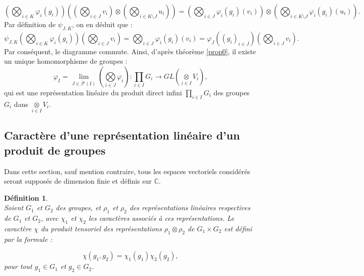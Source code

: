 \documentclass[a4paper, 14pt]{report}
\newtheorem{definition}{Définition}[section]
\begin{document}
\begin{onehalfspace}
{			\[
			\left( \bigotimes_{i \in K} \varphi_i(g_i) \right) \left( \left( \bigotimes_{i \in J} v_i \right) \otimes \left( \bigotimes_{i \in K \setminus J} u_i \right) \right) = \left( \bigotimes_{i \in J} \varphi_i(g_i)(v_i) \right) \otimes \left( \bigotimes_{i \in K \setminus J} \varphi_i(g_i)(u_i) \right).
			\]
			Par définition de \( \psi_{J,K} \), on en déduit que :
			\[
			\psi_{J,K}\left( \bigotimes_{i \in K} \varphi_i(g_i) \right)\left( \bigotimes_{i \in J} v_i \right) = \bigotimes_{i \in J} \varphi_i(g_i)(v_i) = \varphi_J\left( (g_i)_{i \in J} \right) \left( \bigotimes_{i \in J} v_i \right).
			\]
			Par conséquent, le diagramme commute. Ainsi, d'après théorème \ref{prop0}, il existe un unique homomorphisme de groupes :
			$$
			\varphi_I = 	\underset{\overleftarrow{J \in \mathcal{F}(I)}}{\lim} ( \underset{i \in J}{\bigotimes} \varphi_i) : \underset{i\in I} \prod G_i \longrightarrow GL(\underset{i\in I} \otimes V_i),
			$$
			qui est une représentation linéaire du produit direct infini \( \underset{i\in I} \prod G_i \) des groupes \( G_i \) dans \( \underset{i\in I} \otimes V_i \).
			
			\subsection{Caractère d'une représentation linéaire d'un produit de groupes}
Dans cette section, sauf mention contraire, tous les espaces vectoriels considérés seront supposés de dimension finie et définis sur \( \mathbb{C} \). \\
			
			\begin{definition} \cite{serre1971representation}\\
Soient \( G_1 \) et \( G_2 \) des groupes, et \( \rho_1 \) et \( \rho_2 \) des représentations linéaires respectives de \( G_1 \) et \( G_2 \), avec \( \chi_1 \) et \( \chi_2 \) les caractères associés à ces représentations. Le caractère \( \chi \) du produit tensoriel des représentations \( \rho_1 \otimes \rho_2 \) de \( G_1 \times G_2 \) est défini par la formule :
				
				\[
				\chi(g_1, g_2) = \chi_1(g_1) \chi_2(g_2),
				\]
				pour tout \( g_1 \in G_1 \) et \( g_2 \in G_2 \).
			\end{definition}

}
\end{onehalfspace}
\end{document}
